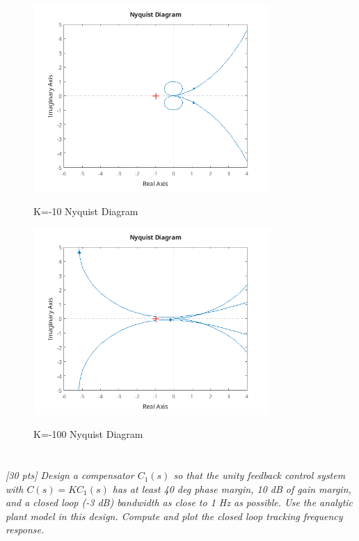 \documentclass{article}
\begin{document}
\begin{figure}[H]
    \centering
    \includegraphics[width=0.8\textwidth]{kNeg10nyquistDiagram.png}
    \label{fig:k-10nyquistDiagram}
    \caption{K=-10 Nyquist Diagram}
\end{figure}

\begin{figure}[H]
    \centering
    \includegraphics[width=0.8\textwidth]{kNeg100nyquistDiagram.png}
    \label{fig:k-100nyquistDiagram}
    \caption{K=-100 Nyquist Diagram}
\end{figure}

\section{}

\textit{[30 pts] Design a compensator \(C_1(s)\) so that the unity feedback control system with \(C(s) = K C_1(s)\) has at least 40 deg phase margin, 10 dB of gain margin, and a closed loop (-3 dB) bandwidth as close to 1 Hz as possible. Use the analytic plant model in this design. Compute and plot the closed loop tracking frequency response.}
\end{document}
